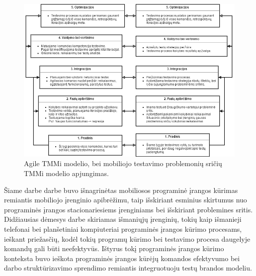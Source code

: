 \documentclass{VUMIFPSkursinis}
\begin{document}
\begin{figure}[H]
    \centering
    \includegraphics[scale=0.75, angle=90]{img/agilemobile}
    \caption{Agile TMMi modelio, bei mobiliojo testavimo problemonių sričių TMMi modelio apjungimas.}
    \label{img:agilemobile}
\end{figure}

Šiame darbe darbe buvo išnagrinėtas mobiliosos programinė įrangos kūrimas remiantis mobiliojo įrenginio apibrėžimu, taip išskiriant esminius skirtumus nuo programinės įrangos stacionariesiems įrenginiams bei išskiriant problemines sritis. Didžiausias dėmesys darbe skiriamas išmaniųjų įrenginių, tokių kaip išmanieji telefonai bei planšetiniai kompiuteriai programinės įrangos kūrimo procesams, ieškant priežasčių, kodėl tokių programų kūrimo bei testavimo procesa daugelyje komandų gali būti neefektyvūs. Ištyrus tokį programinės įrangos kūrimo konteksta buvo ieškota programinės įrangos kūrėjų komandos efektyvumo bei darbo struktūrizavimo sprendimo remiantis integruotuoju testų brandos modeliu.
\end{document}
